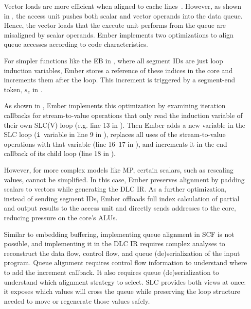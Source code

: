 Vector loads are more efficient when aligned to cache lines~\cite{eichenberger2004pldi,fireman2007algorithms}. However, as shown in , the access unit pushes both scalar and vector operands into the data queue. Hence, the vector loads that the execute unit performs from the queue are misaligned by scalar operands. Ember implements two optimizations to align queue accesses according to code characteristics.

For simpler functions like the EB in , where all segment IDs are just loop induction variables, Ember stores a reference of these indices in the core and increments them after the loop. This increment is triggered by a segment-end token, $s_e$ in .

As shown in , Ember implements this optimization by examining iteration callbacks for stream-to-value operations that only read the induction variable of their own SLC(V) loop (e.g. line 13 in ). Then Ember adds a new variable in the SLC loop (\texttt{i}~variable in line 9 in ), replaces all uses of the stream-to-value operations with that variable (line 16--17 in ), and increments it in the end callback of its child loop (line 18 in ).

However, for more complex models like MP, certain scalars, such as rescaling values, cannot be simplified. In this case, Ember preserves alignment by padding scalars to vectors while generating the DLC IR. As a further optimization, instead of sending segment IDs, Ember offloads full index calculation of partial and output results to the access unit and directly sends addresses to the core, reducing pressure on the core's ALUs.

Similar to embedding buffering, implementing queue alignment in SCF is not possible, and implementing it in the DLC IR requires complex analyses to reconstruct the data flow, control flow, and queue (de)serialization of the input program. Queue alignment requires control flow information to understand where to add the increment callback. It also requires queue (de)serialization to understand which alignment strategy to select. SLC provides both views at once: it exposes which values will cross the queue while preserving the loop structure needed to move or regenerate those values safely.

